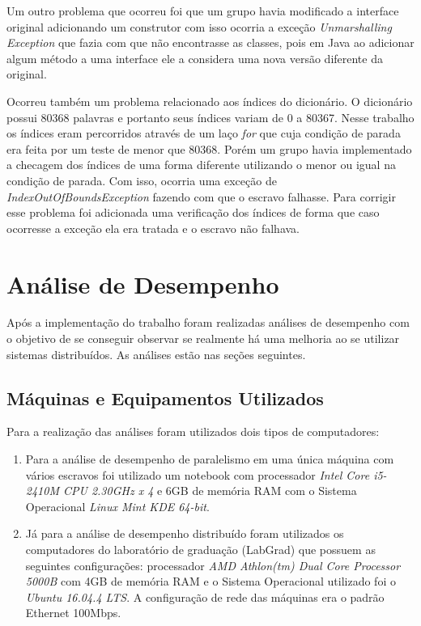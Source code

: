 \documentclass[
	12pt,				%
    oneside,			%
	a4paper,			%
	english,			%
	brazil,				%
	]{abntex2}
\begin{document}
Um outro problema que ocorreu foi que um grupo havia modificado a interface original adicionando um construtor com isso ocorria a exceção \textit{Unmarshalling Exception} que fazia com que não encontrasse as classes, pois em Java ao adicionar algum método a uma interface ele a considera uma nova versão diferente da original.

Ocorreu também um problema relacionado aos índices do dicionário. O dicionário possui 80368 palavras e portanto seus índices variam de 0 a 80367. Nesse trabalho os índices eram percorridos através de um laço \textit{for} que cuja condição de parada
era feita por um teste de menor que 80368. Porém um grupo havia implementado a checagem dos índices de uma forma diferente utilizando o menor ou igual na condição de parada. Com isso, ocorria uma exceção de \textit{IndexOutOfBoundsException} fazendo com que o escravo falhasse. Para corrigir esse problema foi adicionada uma verificação dos índices de forma que caso ocorresse a exceção ela era tratada e o escravo não falhava.

\chapter{Análise de Desempenho} 
Após a implementação do trabalho foram realizadas análises de desempenho com o objetivo de se conseguir observar se realmente
há uma melhoria ao se utilizar sistemas distribuídos. As análises estão nas seções seguintes.

\section{Máquinas e Equipamentos Utilizados}
Para a realização das análises foram utilizados dois tipos de computadores:

\begin{enumerate}

	\item Para a análise de desempenho de paralelismo em uma única máquina com vários escravos foi utilizado um notebook com processador \textit{Intel Core i5-2410M CPU 2.30GHz x 4} e 6GB de memória RAM com o Sistema Operacional \textit{Linux Mint KDE 64-bit}.

	\item Já para a análise de desempenho distribuído foram utilizados os computadores do laboratório de graduação (LabGrad) que possuem as seguintes configurações: processador \textit{AMD Athlon(tm) Dual Core Processor 5000B} com 4GB de memória RAM e o Sistema Operacional utilizado foi o \textit{Ubuntu 16.04.4 LTS}. A configuração de rede das máquinas era o padrão Ethernet 100Mbps.

\end{enumerate}
\end{document}
